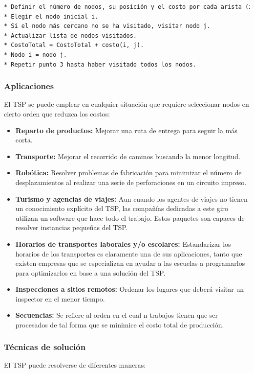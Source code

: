 \begin{lstlisting}[language=HTML, caption=Algoritmo base del TSP., label=lst:codigo10]
* Definir el número de nodos, su posición y el costo por cada arista (i, j) donde i = ciudad 1 y j = ciudad 2.
* Elegir el nodo inicial i.
* Si el nodo más cercano no se ha visitado, visitar nodo j.
* Actualizar lista de nodos visitados.
* CostoTotal = CostoTotal + costo(i, j).
* Nodo i = nodo j.
* Repetir punto 3 hasta haber visitado todos los nodos.
\end{lstlisting}    
     
\subsubsection {Aplicaciones}
El TSP se puede emplear en cualquier situación que requiere seleccionar nodos en cierto orden que reduzca los costos:

\begin{itemize}
  \item \textbf{Reparto de productos:} Mejorar una ruta de entrega para seguir la más corta.
  \item \textbf{Transporte:} Mejorar el recorrido de caminos buscando la menor longitud.
  \item \textbf{Robótica:} Resolver problemas de fabricación para minimizar el número de desplazamientos al realizar una serie de perforaciones en un circuito impreso.
  \item \textbf{Turismo y agencias de viajes:} Aun cuando los agentes de viajes no tienen un conocimiento explícito del TSP, las compañías dedicadas a este giro utilizan un software que hace todo el trabajo. Estos paquetes son capaces de resolver instancias pequeñas del TSP.
  \item \textbf{Horarios de transportes laborales y/o escolares:} Estandarizar los horarios de los transportes es claramente una de sus aplicaciones, tanto que existen empresas que se especializan en ayudar a las escuelas a programarlos para optimizarlos en base a una solución del TSP.
  \item \textbf{Inspecciones a sitios remotos:} Ordenar los lugares que deberá visitar un inspector en el menor tiempo.
  \item \textbf{Secuencias:} Se refiere al orden en el cual n trabajos tienen que ser procesados de tal forma que se minimice el costo total de producción.
\end{itemize}
   
\subsubsection {Técnicas de solución}
El TSP puede resolverse de diferentes maneras:

